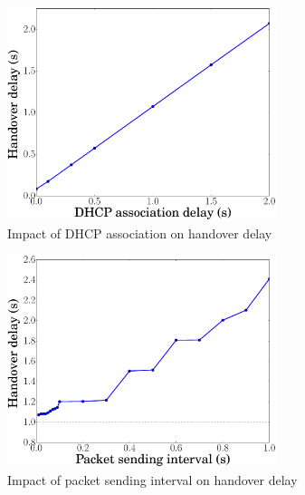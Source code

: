 \begin{figure}[!th]
	\centering
	\includegraphics[width=0.7\textwidth]{Pics/LISP_mobility_LISPMN_DHCP}
	\caption{Impact of DHCP association on handover delay}
	\label{LISP_mobility_LISPMN_DHCP}
\end{figure}


\begin{figure}[!th]
	\centering
	\includegraphics[width=0.7\textwidth]{Pics/LISP_mobility_LISPMN_PacketInterval}
	\caption{Impact of packet sending interval on handover delay}
	\label{LISP_mobility_LISPMN_PacketInterval}
\end{figure}


